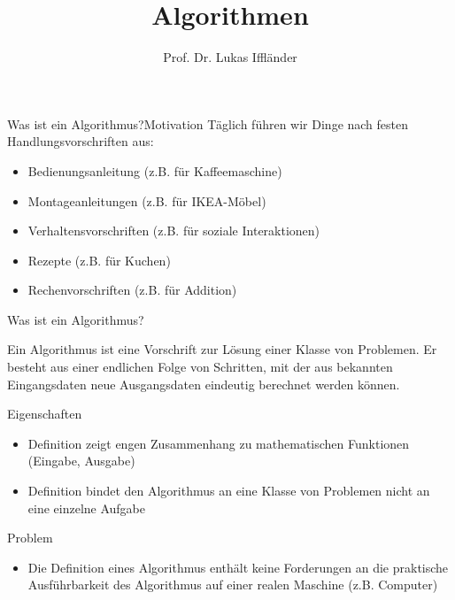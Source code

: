 \documentclass[xelatex,aspectratio=169]{beamer}
\title{Algorithmen}
\author{Prof. Dr. Lukas Iffländer}
\institute{HTW Dresden}
\date{}
\begin{document}
\begin{frame}
  \titlepage
\end{frame}

\begin{frame}{Was ist ein Algorithmus?}{Motivation}
  Täglich führen wir Dinge nach festen Handlungsvorschriften aus:
  \begin{itemize}
    \item Bedienungsanleitung (z.B. für Kaffeemaschine)
    \item Montageanleitungen (z.B. für IKEA-Möbel)
    \item Verhaltensvorschriften (z.B. für soziale Interaktionen)
    \item Rezepte (z.B. für Kuchen)
    \item Rechenvorschriften (z.B. für Addition)
  \end{itemize}

\end{frame}

\begin{frame}{Was ist ein Algorithmus?}
  \begin{definition}
    Ein Algorithmus ist eine Vorschrift zur Lösung einer Klasse von
    Problemen. Er besteht aus einer endlichen Folge von Schritten,
    mit der aus bekannten Eingangsdaten neue Ausgangsdaten eindeutig berechnet werden können.
  \end{definition}

  \begin{block}{Eigenschaften}
    \begin{itemize}
      \item Definition zeigt engen Zusammenhang zu mathematischen Funktionen (Eingabe, Ausgabe)
      \item Definition bindet den Algorithmus an eine Klasse von Problemen nicht an eine einzelne Aufgabe
    \end{itemize}
  \end{block}

  \begin{alertblock}{Problem}
    \begin{itemize}
      \item Die Definition eines Algorithmus enthält keine Forderungen an die praktische Ausführbarkeit des Algorithmus auf einer realen Maschine (z.B. Computer)
    \end{itemize}
  \end{alertblock}
\end{frame}
\end{document}
